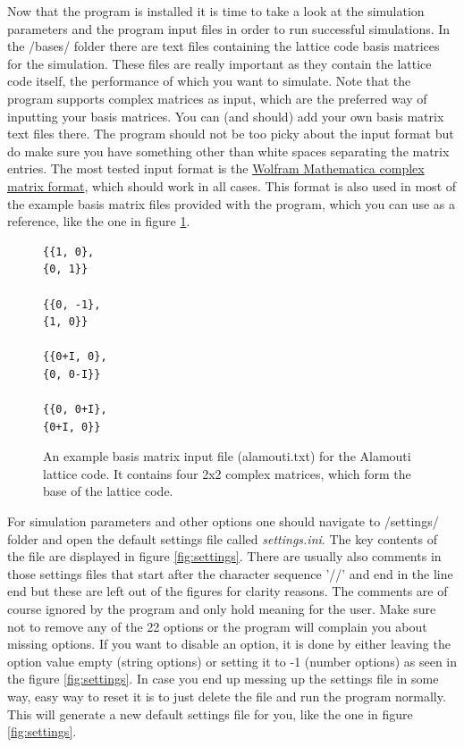\documentclass[english,12pt,a4paper,pdftex,sci,utf8]{aaltothesis}
\begin{document}
Now that the program is installed it is time to take a look at the simulation parameters and the program input files in order to run successful simulations. In the /bases/ folder there are text files containing the lattice code basis matrices for the simulation. These files are really important as they contain the lattice code itself, the performance of which you want to simulate. Note that the program supports complex matrices as input, which are the preferred way of inputting your basis matrices. You can (and should) add your own basis matrix text files there. The program should not be too picky about the input format but do make sure you have something other than white spaces separating the matrix entries. The most tested input format is the \href{http://reference.wolfram.com/language/tutorial/LinearAlgebraMatrixTypes.html#1527024338}{Wolfram Mathematica complex matrix format}, which should work in all cases. This format is also used in most of the example basis matrix files provided with the program, which you can use as a reference, like the one in figure \ref{fig:alamouti_basis}.
\begin{figure}[htb]
\begin{Verbatim}[frame=single]
{{1, 0},
{0, 1}}

{{0, -1},
{1, 0}}

{{0+I, 0},
{0, 0-I}}

{{0, 0+I},
{0+I, 0}}
\end{Verbatim}
\caption{An example basis matrix input file (alamouti.txt) for the Alamouti lattice code. It contains four 2x2 complex matrices, which form the base of the lattice code.}
\label{fig:alamouti_basis}
\end{figure}

\par For simulation parameters and other options one should navigate to /settings/ folder and open the default settings file called \textit{settings.ini}. The key contents of the file are displayed in figure \ref{fig:settings}. There are usually also comments in those settings files that start after the character sequence '//' and end in the line end but these are left out of the figures for clarity reasons. The comments are of course ignored by the program and only hold meaning for the user. Make sure not to remove any of the 22 options or the program will complain you about missing options. If you want to disable an option, it is done by either leaving the option value empty (string options) or setting it to -1 (number options) as seen in the figure \ref{fig:settings}. In case you end up messing up the settings file in some way, easy way to reset it is to just delete the file and run the program normally. This will generate a new default settings file for you, like the one in figure \ref{fig:settings}. 
\end{document}
